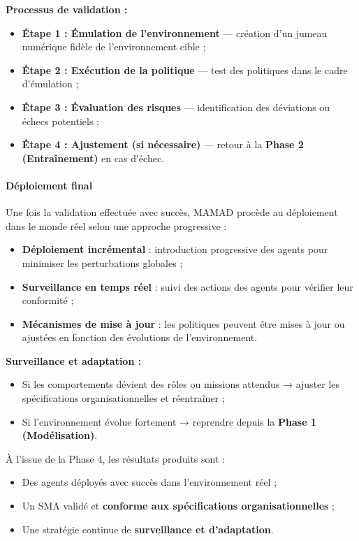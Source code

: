 \vspace{0.4em}
\noindent \textbf{Processus de validation :}
\begin{itemize}
    \item \textbf{Étape 1 : Émulation de l'environnement} — création d'un jumeau numérique fidèle de l'environnement cible ;
    \item \textbf{Étape 2 : Exécution de la politique} — test des politiques dans le cadre d'émulation ;
    \item \textbf{Étape 3 : Évaluation des risques} — identification des déviations ou échecs potentiels ;
    \item \textbf{Étape 4 : Ajustement (si nécessaire)} — retour à la \textbf{Phase 2 (Entraînement)} en cas d'échec.
\end{itemize}

\paragraph{Déploiement final}

Une fois la validation effectuée avec succès, MAMAD procède au déploiement dans le monde réel selon une approche progressive :

\begin{itemize}
    \item \textbf{Déploiement incrémental} : introduction progressive des agents pour minimiser les perturbations globales ;
    \item \textbf{Surveillance en temps réel} : suivi des actions des agents pour vérifier leur conformité ;
    \item \textbf{Mécanismes de mise à jour} : les politiques peuvent être mises à jour ou ajustées en fonction des évolutions de l'environnement.
\end{itemize}

\vspace{0.4em}
\noindent \textbf{Surveillance et adaptation :}
\begin{itemize}
    \item Si les comportements dévient des rôles ou missions attendus → ajuster les spécifications organisationnelles et réentraîner ;
    \item Si l'environnement évolue fortement → reprendre depuis la \textbf{Phase 1 (Modélisation)}.
\end{itemize}

\vspace{0.4em}
\noindent À l'issue de la Phase 4, les résultats produits sont :
\begin{itemize}
    \item Des agents déployés avec succès dans l'environnement réel ;
    \item Un SMA validé et \textbf{conforme aux spécifications organisationnelles} ;
    \item Une stratégie continue de \textbf{surveillance et d'adaptation}.
\end{itemize}


